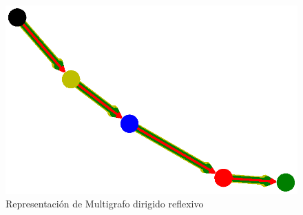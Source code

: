 \documentclass{article}
\begin{document}


\begin{figure}
    \centering
    \includegraphics[scale=0.6]{imagenes/Fig12.eps}
    \caption{Representación de Multigrafo dirigido reflexivo}
    \label{fig:Fig12}
\end{figure}




\end{document}
